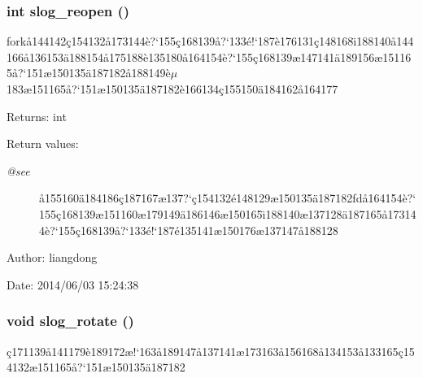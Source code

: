 \subsubsection{\setlength{\rightskip}{0pt plus 5cm}int slog\_\-reopen ()}\label{slog_8c_a7}


fork\aa{}144142\c{c}154132\aa{}173144\`{e}?`155\c{c}168139\aa{}?`133\'{e}!`187\`{e}176131\c{c}148168\"{\i}188140\aa{}144166\aa{}136153\"{a}188154\aa{}175188\`{e}135180\aa{}164154\`{e}?`155\c{c}168139\ae{}147141\"{a}189156\ae{}151165\aa{}?`151\ae{}150135\"{a}187182\aa{}188149\`{e}$\mu$183\ae{}151165\aa{}?`151\ae{}150135\"{a}187182\`{e}166134\c{c}155150\"{a}184162\aa{}164177 

\begin{Desc}
\item[Returns:]int \end{Desc}
\begin{Desc}
\item[Return values:]
\begin{description}
\item[{\em @see}]\aa{}155160\"{a}184186\c{c}187167\ae{}137?`\c{c}154132\'{e}148129\ae{}150135\"{a}187182fd\aa{}164154\`{e}?`155\c{c}168139\ae{}151160\ae{}179149\"{a}186146\ae{}150165\"{\i}188140\ae{}137128\"{a}187165\aa{}173144\`{e}?`155\c{c}168139\aa{}?`133\'{e}!`187\'{e}135141\ae{}150176\ae{}137147\aa{}188128 \end{description}
\end{Desc}
\begin{Desc}
\item[Author:]liangdong \end{Desc}
\begin{Desc}
\item[Date:]2014/06/03 15:24:38 \end{Desc}
\subsubsection{\setlength{\rightskip}{0pt plus 5cm}void slog\_\-rotate ()}\label{slog_8c_a12}


\c{c}171139\aa{}141179\`{e}189172\ae{}!`163\aa{}189147\aa{}137141\ae{}173163\aa{}156168\aa{}134153\aa{}133165\c{c}154132\ae{}151165\aa{}?`151\ae{}150135\"{a}187182 

